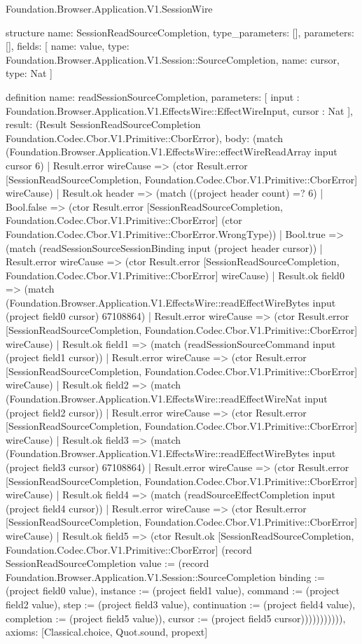 \begin{lexlean}{Foundation.Browser.Application.V1.SessionWire}
\begin{semanticmodule}
structure{
  name: SessionReadSourceCompletion,
  type_parameters: [],
  parameters: [],
  fields: [
    {name: value, type: Foundation.Browser.Application.V1.Session::SourceCompletion},
    {name: cursor, type: Nat}
  ]
}

definition{
  name: readSessionSourceCompletion,
  parameters: [
    input : Foundation.Browser.Application.V1.EffectsWire::EffectWireInput,
    cursor : Nat
  ],
  result: (Result SessionReadSourceCompletion Foundation.Codec.Cbor.V1.Primitive::CborError),
  body: (match (Foundation.Browser.Application.V1.EffectsWire::effectWireReadArray input cursor 6)
    | Result.error wireCause => (ctor Result.error [SessionReadSourceCompletion, Foundation.Codec.Cbor.V1.Primitive::CborError] wireCause)
    | Result.ok header => (match ((project header count) =? 6)
      | Bool.false => (ctor Result.error [SessionReadSourceCompletion, Foundation.Codec.Cbor.V1.Primitive::CborError] (ctor Foundation.Codec.Cbor.V1.Primitive::CborError.WrongType))
      | Bool.true => (match (readSessionSourceSessionBinding input (project header cursor))
        | Result.error wireCause => (ctor Result.error [SessionReadSourceCompletion, Foundation.Codec.Cbor.V1.Primitive::CborError] wireCause)
        | Result.ok field0 => (match (Foundation.Browser.Application.V1.EffectsWire::readEffectWireBytes input (project field0 cursor) 67108864)
          | Result.error wireCause => (ctor Result.error [SessionReadSourceCompletion, Foundation.Codec.Cbor.V1.Primitive::CborError] wireCause)
          | Result.ok field1 => (match (readSessionSourceCommand input (project field1 cursor))
            | Result.error wireCause => (ctor Result.error [SessionReadSourceCompletion, Foundation.Codec.Cbor.V1.Primitive::CborError] wireCause)
            | Result.ok field2 => (match (Foundation.Browser.Application.V1.EffectsWire::readEffectWireNat input (project field2 cursor))
              | Result.error wireCause => (ctor Result.error [SessionReadSourceCompletion, Foundation.Codec.Cbor.V1.Primitive::CborError] wireCause)
              | Result.ok field3 => (match (Foundation.Browser.Application.V1.EffectsWire::readEffectWireBytes input (project field3 cursor) 67108864)
                | Result.error wireCause => (ctor Result.error [SessionReadSourceCompletion, Foundation.Codec.Cbor.V1.Primitive::CborError] wireCause)
                | Result.ok field4 => (match (readSourceEffectCompletion input (project field4 cursor))
                  | Result.error wireCause => (ctor Result.error [SessionReadSourceCompletion, Foundation.Codec.Cbor.V1.Primitive::CborError] wireCause)
                  | Result.ok field5 => (ctor Result.ok [SessionReadSourceCompletion, Foundation.Codec.Cbor.V1.Primitive::CborError] (record SessionReadSourceCompletion {value := (record Foundation.Browser.Application.V1.Session::SourceCompletion {binding := (project field0 value), instance := (project field1 value), command := (project field2 value), step := (project field3 value), continuation := (project field4 value), completion := (project field5 value)}), cursor := (project field5 cursor)})))))))))),
  axioms: [Classical.choice, Quot.sound, propext]
}


\end{semanticmodule}
\end{lexlean}
